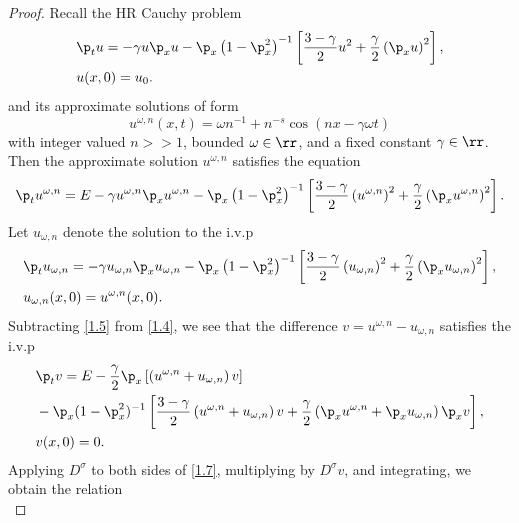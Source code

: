       \begin{proof} Recall the HR Cauchy problem
\begin{align}
	\label{1.1}
	&\p_t u  = -\gamma u \p_x u - \p_x\left( 1-\p_x^2
		\right)^{-1}\left[ \frac{3-\gamma}{2}
		u^2 + \frac{\gamma}{2}\left( \p_x
		u
		\right)^2 \right],
		\\
		\label{1.2}
		& u(x,0) = u_0.
\end{align}
and its approximate solutions of form
	\begin{equation}
		\label{approx-solns-form}
		u^{\omega,n}(x,t) = \omega n^{-1} + n^{-s} \cos \left( nx - \gamma \omega t
		\right) 
	\end{equation}
	with integer valued $n >>1$, bounded $\omega \in \rr$, and a fixed 
	constant $\gamma \in \rr$.	Then the approximate solution 
	$u^{\omega,n}$ satisfies the equation
\begin{equation}
	\begin{split}
		\label{1.4}
		\p_t u^{\omega,n} = E - \gamma u^{\omega,n} \p_x u^{\omega,n} 
		- \p_x\left( 1-\p_x^2 \right)^{-1} \left[
		\frac{3-\gamma}{2} \left( u^{\omega,n} \right)^2 +
		\frac{\gamma}{2}\left( \p_x u^{\omega,n} \right)^2 \right].
	\end{split}
\end{equation}
Let $u_{\omega,n}$ denote the solution to the i.v.p
\begin{align}
	\label{1.5}
	&\p_t u_{\omega,n}  = -\gamma u_{\omega,n} \p_x u_{\omega,n} - 
	\p_x\left( 1-\p_x^2
		\right)^{-1}\left[ \frac{3-\gamma}{2}\left(
		u_{\omega,n} \right)^2 + \frac{\gamma}{2}\left( \p_x
		u_{\omega,n}
		\right)^2 \right],
		\\
		& u_{\omega,n}(x,0) = u^{\omega,n}(x,0).
\end{align}
Subtracting \eqref{1.5} from \eqref{1.4}, we see that the
difference $v = u^{\omega,n} - u_{\omega,n}$ satisfies the i.v.p
\begin{align}
		\label{1.7}
		& \p_t v  =  E - \frac{\gamma}{2} \p_x
		\left[ \left( u^{\omega,n} + u_{\omega,n} \right)v \right]
		 \notag
		\\
		& - \p_x(1-\p_x^2)^{-1} \left[
		\frac{3-\gamma}{2} \left( u^{\omega,n} + u_{\omega,n}
		\right) v +
		\frac{\gamma}{2}\left( \p_x u^{\omega,n} +
		\p_x u_{\omega,n}
		\right) \p_x v
		\right], 
		\\
		& v(x,0)=0.
\end{align}
Applying $D^\sigma$ to both sides of \eqref{1.7}, multiplying by
$D^\sigma v$, and integrating, we obtain the
relation
\begin{equation}

\end{equation}
\end{proof}
